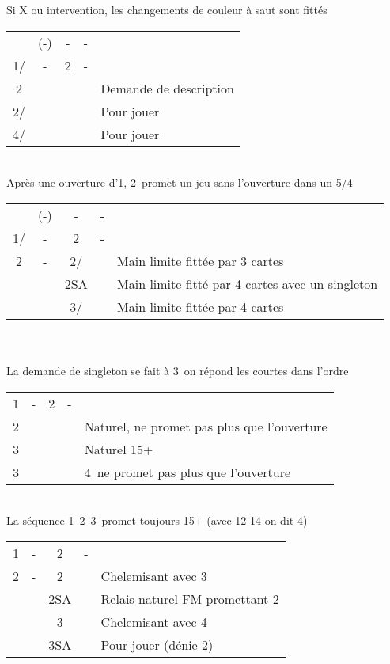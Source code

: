 \documentclass[a4paper, oneside, 11pt]{report}
\begin{document}
		Si X ou intervention, les changements de couleur à saut sont fittés\\

		\begin{tabular}{cccc|l}
		& (-) & - & - &\\
		1\coeur/\pique & - & 2\trefle & - &\\
		2\carreau &&&& Demande de description\\
		2\coeur/\pique &&&& Pour jouer\\
		4\coeur/\pique &&&& Pour jouer\\
		\end{tabular}\\
		Après une ouverture d'1\pique, 2\coeur\ promet un jeu sans l'ouverture dans un 5/4\\

		\begin{tabular}{cccc|l}
		& (-) & - & - &\\
		1\coeur/\pique & - & 2\trefle & - &\\
		2\carreau & - & 2\coeur/\pique && Main limite fittée par 3 cartes\\
		&& 2SA && Main limite fitté par 4 cartes avec un singleton\\
		&& 3\coeur/\pique && Main limite fittée par 4 cartes\\
		\end{tabular}\\\\
		
		La demande de singleton se fait à 3\trefle\ on répond les courtes dans l'ordre\\

\newpage
		\begin{tabular}{cccc|l}
		1\coeur & - & 2\carreau & - &\\
		2\pique &&&& Naturel,  ne promet pas plus que l'ouverture\\
		3\trefle &&&& Naturel 15+\\
		3\carreau &&&& 4\carreau\, ne promet pas plus que l'ouverture\\
		\end{tabular}\\
		La séquence 1\pique\ 2\coeur\ 3\coeur\ promet toujours 15+ (avec 12-14 on dit 4\coeur)\\

		\begin{tabular}{cccc|l}
		1\pique & - & 2\carreau & - &\\
		2\coeur & - & 2\pique && Chelemisant avec 3\pique\\
		&& 2SA && Relais naturel FM promettant 2\pique\\
		&& 3\pique && Chelemisant avec 4\pique\\
		&& 3SA && Pour jouer (dénie 2\pique)\\
		\end{tabular}\\\\
\end{document}
